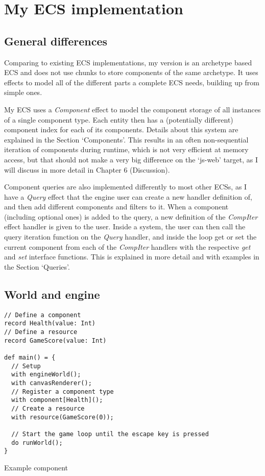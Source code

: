 \chapter{My ECS implementation}\label{chap:ecs}

\section{General differences}

Comparing to existing ECS implementations, my version is an archetype based ECS and does not use chunks to store components of the same archetype. It uses effects to model all of the different parts a complete ECS needs, building up from simple ones.

My ECS uses a \textit{Component} effect to model the component storage of all instances of a single component type. Each entity then has a (potentially different) component index for each of its components. Details about this system are explained in the Section `Components'. This results in an often non-sequential iteration of components during runtime, which is not very efficient at memory access, but that should not make a very big difference on the `js-web' target, as I will discuss in more detail in Chapter 6 (Discussion).

Component queries are also implemented differently to most other ECSs, as I have a \textit{Query} effect that the engine user can create a new handler definition of, and then add different components and filters to it. When a component (including optional ones) is added to the query, a new definition of the \textit{CompIter} effect handler is given to the user. Inside a system, the user can then call the query iteration function on the \textit{Query} handler, and inside the loop get or set the current component from each of the \textit{CompIter} handlers with the respective \textit{get} and \textit{set} interface functions. This is explained in more detail and with examples in the Section `Queries'.

\section{World and engine}

\begin{listing}
\begin{lstlisting}
// Define a component
record Health(value: Int)
// Define a resource
record GameScore(value: Int)

def main() = {
  // Setup
  with engineWorld();
  with canvasRenderer();
  // Register a component type
  with component[Health]();
  // Create a resource
  with resource(GameScore(0));

  // Start the game loop until the escape key is pressed
  do runWorld();
}
\end{lstlisting}
\caption{Example component}
\label{lst:ex-setup-component}
\end{listing}

